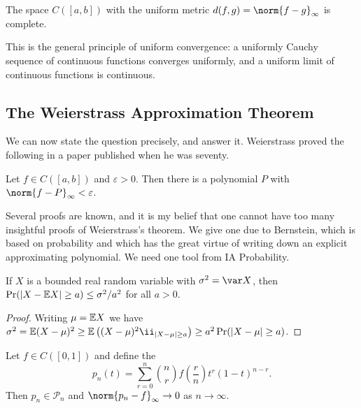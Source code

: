 \documentclass[a4paper]{scrartcl}
\newcommand{\Pn}{\mathcal{P}}
\begin{document}
\begin{theorem}\label{thm:cab-complete}
	The space $C([a,b])$ with the uniform metric $d(f,g) = \norm{f-g}_\infty$ is complete.
\end{theorem}

This is the general principle of uniform convergence: a uniformly Cauchy sequence of continuous functions converges uniformly, and a uniform limit of continuous functions is continuous.

\subsection{The Weierstrass Approximation Theorem}

We can now state the question precisely, and answer it. Weierstrass proved the following in a paper published when he was seventy.

\begin{theorem}\label{thm:weierstrass}
	Let $f \in C([a,b])$ and $\varepsilon>0$. Then there is a polynomial $P$ with $\norm{f-P}_\infty<\varepsilon$.
\end{theorem}

Several proofs are known, and it is my belief that one cannot have too many insightful proofs of Weierstrass's theorem. We give one due to Bernstein, which is based on probability and which has the great virtue of writing down an explicit approximating polynomial. We need one tool from IA Probability.

\begin{theorem}\label{thm:chebyshev-ineq}
	If $X$ is a bounded real random variable with $\sigma^2 = \var X$, then $\Pr(|X-\mathbb{E} X|\geq a) \leq \sigma^2/a^2$ for all $a>0$.
\end{theorem}

\begin{proof}
	Writing $\mu = \mathbb{E} X$ we have $\sigma^2 = \EE(X-\mu)^2 \geq \EE\left((X-\mu)^2\ii_{|X-\mu|\geq a}\right) \geq a^2\Pr(|X-\mu|\geq a)$.
\end{proof}

\begin{theorem}[Bernstein]\label{thm:bernstein}
	Let $f\in C([0,1])$ and define the 
	$$p_n(t) = \sum_{r=0}^n\binom{n}{r}f\!\left(\frac{r}{n}\right)t^r(1-t)^{n-r}.$$
	Then $p_n \in \Pn_n$ and $\norm{p_n - f}_\infty\to 0$ as $n \to\infty$.
\end{theorem}
\end{document}
